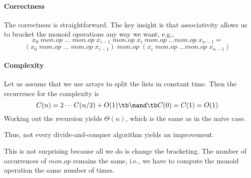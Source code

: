 \paragraph{Correctness}
The correctness is straightforward.
The key insight is that associativity allows us to bracket the monoid operations any way we want, e.g.,
\[x_0 \;mon.op\;\ldots \;mon.op\; x_{i-1} \;mon.op\; x_i \;mon.op\; \ldots mon.op\; x_{n-1} =\]
\[(x_0 \;mon.op\; \ldots \;mon.op\; x_{i-1}) \;mon.op\; (x_i \;mon.op\; \ldots mon.op\; x_{n-1}) \]

\paragraph{Complexity}
Let us assume that we use arrays to split the lists in constant time.
Then the recurrence for the complexity is
 \[C(n)=2\cdots C(n/2)+O(1) \tb\mand\tb C(0)=C(1)= O(1)\]
Working out the recursion yields $\Theta(n)$, which is the same as in the naive case.

Thus, not every divide-and-conquer algorithm yields an improvement.

This is not surprising because all we do is change the bracketing.
The number of occurrences of $mon.op$ remains the same, i.e., we have to compute the monoid operation the same number of times.